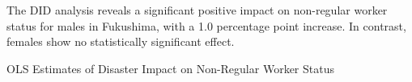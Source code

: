 \documentclass[serif, aspectratio=169]{beamer}
\begin{document}





\begin{frame}[label=nonregular_status]

The DID analysis reveals a significant positive impact on non-regular worker status for males in Fukushima, with a 1.0 percentage point increase. In contrast, females show no statistically significant effect.

\begin{table}[htbp]
\centering
\caption{OLS Estimates of Disaster Impact on Non-Regular Worker Status}

\vspace{-0.2cm}



\end{table}
\end{frame}
\end{document}
